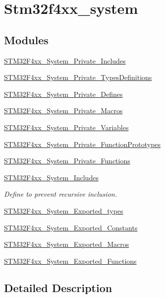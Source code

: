 \hypertarget{group__stm32f4xx__system}{\section{Stm32f4xx\-\_\-system}
\label{group__stm32f4xx__system}
}
\subsection*{Modules}
\begin{DoxyCompactItemize}
\item 
\hyperlink{group___s_t_m32_f4xx___system___private___includes}{S\-T\-M32\-F4xx\-\_\-\-System\-\_\-\-Private\-\_\-\-Includes}
\item 
\hyperlink{group___s_t_m32_f4xx___system___private___types_definitions}{S\-T\-M32\-F4xx\-\_\-\-System\-\_\-\-Private\-\_\-\-Types\-Definitions}
\item 
\hyperlink{group___s_t_m32_f4xx___system___private___defines}{S\-T\-M32\-F4xx\-\_\-\-System\-\_\-\-Private\-\_\-\-Defines}
\item 
\hyperlink{group___s_t_m32_f4xx___system___private___macros}{S\-T\-M32\-F4xx\-\_\-\-System\-\_\-\-Private\-\_\-\-Macros}
\item 
\hyperlink{group___s_t_m32_f4xx___system___private___variables}{S\-T\-M32\-F4xx\-\_\-\-System\-\_\-\-Private\-\_\-\-Variables}
\item 
\hyperlink{group___s_t_m32_f4xx___system___private___function_prototypes}{S\-T\-M32\-F4xx\-\_\-\-System\-\_\-\-Private\-\_\-\-Function\-Prototypes}
\item 
\hyperlink{group___s_t_m32_f4xx___system___private___functions}{S\-T\-M32\-F4xx\-\_\-\-System\-\_\-\-Private\-\_\-\-Functions}
\item 
\hyperlink{group___s_t_m32_f4xx___system___includes}{S\-T\-M32\-F4xx\-\_\-\-System\-\_\-\-Includes}
\begin{DoxyCompactList}\small\item\em Define to prevent recursive inclusion. \end{DoxyCompactList}\item 
\hyperlink{group___s_t_m32_f4xx___system___exported__types}{S\-T\-M32\-F4xx\-\_\-\-System\-\_\-\-Exported\-\_\-types}
\item 
\hyperlink{group___s_t_m32_f4xx___system___exported___constants}{S\-T\-M32\-F4xx\-\_\-\-System\-\_\-\-Exported\-\_\-\-Constants}
\item 
\hyperlink{group___s_t_m32_f4xx___system___exported___macros}{S\-T\-M32\-F4xx\-\_\-\-System\-\_\-\-Exported\-\_\-\-Macros}
\item 
\hyperlink{group___s_t_m32_f4xx___system___exported___functions}{S\-T\-M32\-F4xx\-\_\-\-System\-\_\-\-Exported\-\_\-\-Functions}
\end{DoxyCompactItemize}


\subsection{Detailed Description}

